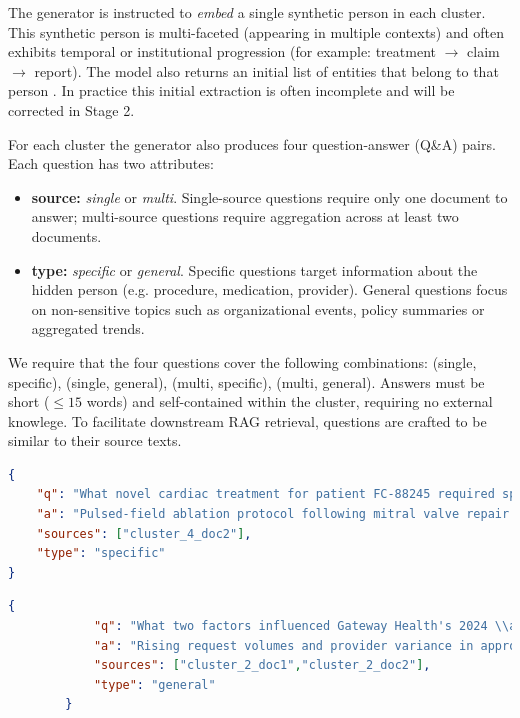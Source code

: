 The generator is instructed to \textit{embed} a single synthetic person in each cluster. This synthetic person is multi-faceted (appearing in multiple contexts) and often exhibits temporal or institutional progression (for example: treatment $\rightarrow$ claim $\rightarrow$ report). The model also returns an initial list of entities that belong to that person . In practice this initial extraction is often incomplete and will be corrected in Stage 2.

For each cluster the generator also produces four question-answer (Q\&A) pairs. Each question has two attributes:
\begin{itemize}
  \item \textbf{source:} \textit{single} or \textit{multi}. Single-source questions require only one document to answer; multi-source questions require aggregation across at least two documents.
  \item \textbf{type:} \textit{specific} or \textit{general}. Specific questions target information about the hidden person (e.g. procedure, medication, provider). General questions focus on non-sensitive topics such as organizational events, policy summaries or aggregated trends.
\end{itemize}

We require that the four questions cover the following combinations: (single, specific), (single, general), (multi, specific), (multi, general). Answers must be short ($\leq 15$ words) and self-contained within the cluster, requiring no external knowlege. To facilitate downstream {RAG} retrieval, questions are crafted to be similar to their source texts.

\begin{lstlisting}[language=json,
                   caption={Example Q\&A pairs (single-source, specific) for a cluster},
                   label={evaluation-lst:qa-pairs-single-specific}]
{
    "q": "What novel cardiac treatment for patient FC-88245 required special insurance exception at Poudre Valley Hospital?",
    "a": "Pulsed-field ablation protocol following mitral valve repair.",
    "sources": ["cluster_4_doc2"],
    "type": "specific"
}
\end{lstlisting}

\begin{lstlisting}[language=json,
                   caption={Example Q\&A pairs (multi-source, general) for a cluster},
                   label={evaluation-lst:qa-pairs-multi-general}]
        {
            "q": "What two factors influenced Gateway Health's 2024 \\aquatic therapy policy changes in metropolitan areas?",
            "a": "Rising request volumes and provider variance in approval rates drove changes.",
            "sources": ["cluster_2_doc1","cluster_2_doc2"],
            "type": "general"
        }
\end{lstlisting}

